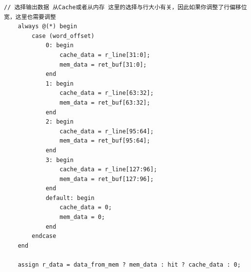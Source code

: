 \documentclass[12pt,a4paper]{ctexart}
\begin{document}
\begin{lstlisting}[style=verilog]
    // 选择输出数据 从Cache或者从内存 这里的选择与行大小有关，因此如果你调整了行偏移位宽，这里也需要调整
    always @(*) begin
        case (word_offset)
            0: begin
                cache_data = r_line[31:0];
                mem_data = ret_buf[31:0];
            end
            1: begin
                cache_data = r_line[63:32];
                mem_data = ret_buf[63:32];
            end
            2: begin
                cache_data = r_line[95:64];
                mem_data = ret_buf[95:64];
            end
            3: begin
                cache_data = r_line[127:96];
                mem_data = ret_buf[127:96];
            end
            default: begin
                cache_data = 0;
                mem_data = 0;
            end
        endcase
    end

    assign r_data = data_from_mem ? mem_data : hit ? cache_data : 0;


\end{lstlisting}
\end{document}
